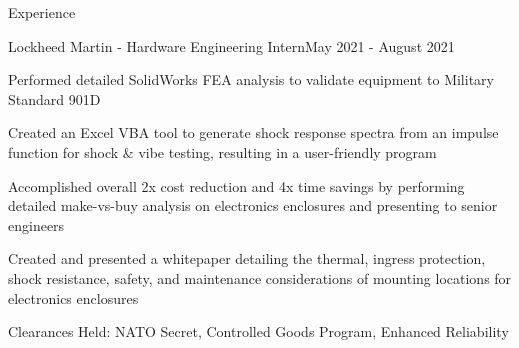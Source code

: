 \documentclass{resume} %
\begin{document}
\begin{rSection}{Experience}
\begin{comment}
\end{rSubsection}

\end{comment}

\begin{rSubsection}{Lockheed Martin - Hardware Engineering Intern}{May 2021 - August 2021}{}{}

\item Performed detailed SolidWorks FEA analysis to validate equipment to Military Standard 901D
\item Created an Excel VBA tool to generate shock response spectra from an impulse function for shock \& vibe testing, resulting in a user-friendly program
\item Accomplished overall 2x cost reduction and 4x time savings by performing detailed make-vs-buy analysis on electronics enclosures and presenting to senior engineers
\item Created and presented a whitepaper detailing the thermal, ingress protection, shock resistance, safety, and maintenance considerations of mounting locations for electronics enclosures
\item Clearances Held: NATO Secret, Controlled Goods Program, Enhanced Reliability

\end{rSubsection}

\begin{comment}
\begin{rSubsection}{Department of National Defense - Engineering Intern}{May 2020 - September 2020}{}{}

\item Documented and presented key specifications on armored patrol vehicles for 411 vehicles in 69 variants
\item Reworked procurement documents based on technical requirements from multiple military bases
\item Proofread english-to-french translations of contracts to ensure correctness

\end{rSubsection}
\end{comment}
\end{rSection}
\end{document}
